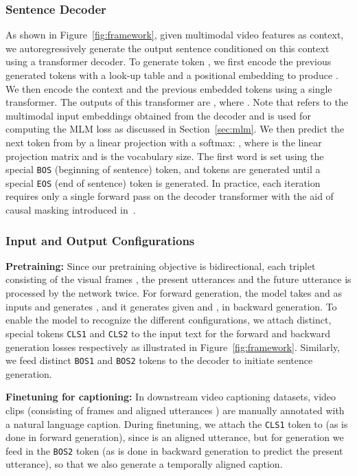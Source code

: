 \documentclass[10pt,twocolumn,letterpaper]{article}
\begin{document}
\subsubsection{Sentence Decoder}
As shown in Figure~\ref{fig:framework}, given multimodal video features  as context, we autoregressively generate the output sentence  conditioned on this context using a transformer decoder.
To generate token , we first encode the previous generated tokens  with a look-up table and a positional embedding to produce .
We then encode the context  and the previous embedded tokens  using a single transformer. The outputs of this transformer are , where .
Note that  refers to the multimodal input embeddings obtained from the decoder and is used for computing the MLM loss as discussed in Section~\ref{sec:mlm}.
We then predict the next token  from  by a linear projection with a softmax: , where  is the linear projection matrix and  is the vocabulary size.
The first word  is set using the special \texttt{BOS} (beginning of sentence) token, and tokens are generated until a special \texttt{EOS} (end of sentence) token is generated.
In practice, each iteration requires only a single forward pass on the decoder transformer with the aid of causal masking introduced in~\cite{vaswani2017attention}. 

\subsubsection{Input and Output Configurations}
\noindent\textbf{Pretraining:} 
Since our pretraining objective is bidirectional, each triplet  consisting of the visual frames , the present utterances  and the future utterance  is processed by the network twice.
For forward generation, the model takes  and  as inputs and generates , and it generates  given  and , in backward generation.
To enable the model to recognize the different configurations, we attach distinct, special tokens \texttt{CLS1} and \texttt{CLS2} to the input text for the forward and backward generation losses respectively as illustrated in Figure~\ref{fig:framework}.
Similarly, we feed distinct \texttt{BOS1} and \texttt{BOS2} tokens to the decoder to initiate sentence generation.

\noindent\textbf{Finetuning for captioning:}
In downstream video captioning datasets, video clips (consisting of frames  and aligned utterances ) are manually annotated with a natural language caption.
During finetuning, we attach the \texttt{CLS1} token to  (as is done in forward generation), since  is an aligned utterance, but for generation we feed in the \texttt{BOS2} token (as is done in backward generation to predict the present utterance), so that we also generate a temporally aligned caption.
\vspace{-0.05\baselineskip}  
\end{document}
